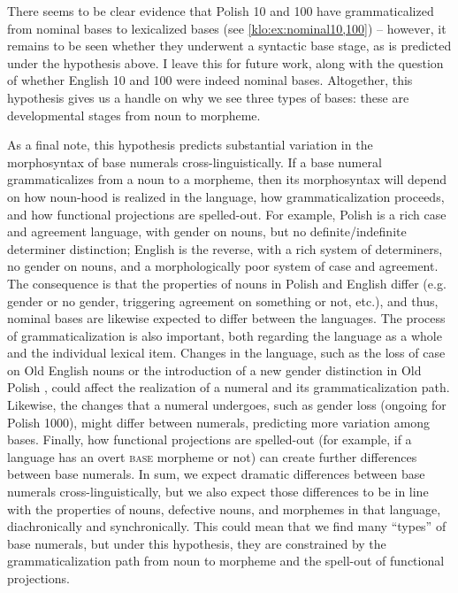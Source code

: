 \documentclass[output=paper]{langscibook}
\begin{document}

There seems to be clear evidence that Polish 10 and 100 have grammaticalized from nominal bases to lexicalized bases (see \ref{klo:ex:nominal10,100}) -- however, it remains to be seen whether they underwent a syntactic base stage, as is predicted under the hypothesis above. I leave this for future work, along with the question of whether English 10 and 100 were indeed nominal bases. Altogether, this hypothesis gives us a handle on why we see three types of bases: these are developmental stages from noun to morpheme.

As a final note, this hypothesis predicts substantial variation in the morphosyntax of base numerals cross-linguistically. If a base numeral grammaticalizes from a noun to a morpheme, then its morphosyntax will depend on how noun-hood is realized in the language, how grammaticalization proceeds, and how functional projections are spelled-out. For example, Polish is a rich case and agreement language, with gender on nouns, but no definite/indefinite determiner distinction; English is the reverse, with a rich system of determiners, no gender on nouns, and a morphologically poor system of case and agreement. The consequence is that the properties of nouns in Polish and English differ (e.g. gender or no gender, triggering agreement on something or not, etc.), and thus, nominal bases are likewise expected to differ between the languages. The process of grammaticalization is also important, both regarding the language as a whole and the individual lexical item. Changes in the language, such as the loss of case on Old English nouns or the introduction of a new gender distinction in Old Polish \citep{miechowiczDziubala2013}, could affect the realization of a numeral and its grammaticalization path. Likewise, the changes that a numeral undergoes, such as gender loss (ongoing for Polish 1000), might differ between numerals, predicting more variation among bases. Finally, how functional projections are spelled-out (for example, if a language has an overt \textsc{base} morpheme or not) can create further differences between base numerals. In sum, we expect dramatic differences between base numerals cross-linguistically, but we also expect those differences to be in line with the properties of nouns, defective nouns, and morphemes in that language, diachronically and synchronically. This could mean that we find many ``types'' of base numerals, but under this hypothesis, they are constrained by the grammaticalization path from noun to morpheme and the spell-out of functional projections. 
\end{document}
